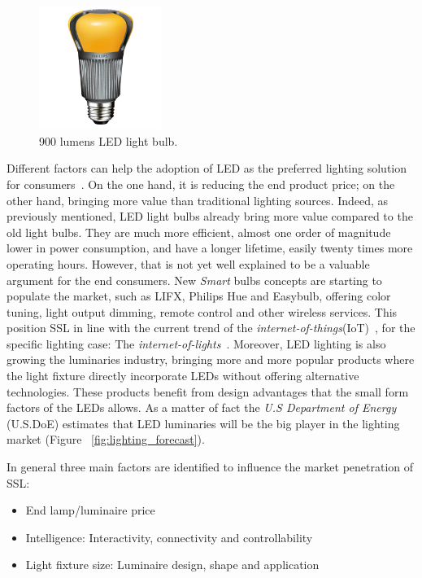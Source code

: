 \vspace{5mm} %


\begin{figure}[!h]
\centering
\includegraphics[width=4cm]{./0_intro/img/enduraled-12w.jpg}
\caption{900 lumens LED light bulb.}
\label{fig:l_prize}
\end{figure}

Different factors can help the adoption of LED as the preferred lighting solution for consumers~\cite{11Voger}. On the one hand, it is reducing the end product price; on the other hand, bringing more value than traditional lighting sources. Indeed, as previously mentioned, LED light bulbs already bring more value compared to the old light bulbs. They are much more efficient, almost one order of magnitude lower in power consumption, and have a longer lifetime, easily twenty times more operating hours. However, that is not yet well explained to be a valuable argument for the end consumers. New \emph{Smart} bulbs concepts are starting to populate the market, such as LIFX, Philips Hue and Easybulb, offering color tuning, light output dimming, remote control and other wireless services. This position SSL in line with the current trend of the \emph{internet-of-things}(IoT)~\cite{03Qiu,atzori2010internet,weber2010internet}, for the specific lighting case: The \emph{internet-of-lights}~\cite{14Harbers,web:14Harbers}. Moreover, LED lighting is also growing the luminaries industry, bringing more and more popular products where the light fixture directly incorporate LEDs without offering alternative technologies. These products benefit from design advantages that the small form factors of the LEDs allows. As a matter of fact the \emph{U.S Department of Energy} (U.S.DoE) estimates that LED luminaries will be the big player in the lighting market (Figure ~\ref{fig:lighting_forecast}).

In general three main factors are identified to influence the market penetration of SSL:
\begin{itemize}
  \item End lamp/luminaire price
  \item Intelligence: Interactivity, connectivity and controllability\
  \item Light fixture size: Luminaire design, shape and application
\end{itemize}

